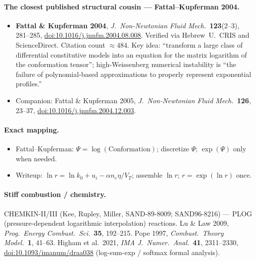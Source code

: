 \documentclass[11pt]{article}
\newcommand{\VT}{V_{T}}
\begin{document}
\paragraph{The closest published structural cousin --- Fattal--Kupferman 2004.}
\begin{itemize}
\item \textbf{Fattal \& Kupferman 2004}, \emph{J.~Non-Newtonian Fluid Mech.}\
      \textbf{123}(2--3), 281--285,
      \href{https://doi.org/10.1016/j.jnnfm.2004.08.008}{doi:10.1016/j.jnnfm.2004.08.008}.
      Verified via Hebrew~U.\ CRIS and ScienceDirect. Citation count
      $\approx 484$. Key idea: ``transform a large class of differential
      constitutive models into an equation for the matrix logarithm of the
      conformation tensor''; high-Weissenberg numerical instability is
      ``the failure of polynomial-based approximations to properly represent
      exponential profiles.''
\item Companion: Fattal \& Kupferman 2005, \emph{J.~Non-Newtonian Fluid
      Mech.}\ \textbf{126}, 23--37,
      \href{https://doi.org/10.1016/j.jnnfm.2004.12.003}{doi:10.1016/j.jnnfm.2004.12.003}.
\end{itemize}

\paragraph{Exact mapping.}
\begin{itemize}
\item Fattal--Kupferman: $\Psi=\log(\mathrm{Conformation})$; discretize
      $\Psi$; $\exp(\Psi)$ only when needed.
\item Writeup: $\ln r=\ln k_0+u_i-\alpha n_e\eta/\VT$; assemble $\ln r$;
      $r=\exp(\ln r)$ once.
\end{itemize}

\paragraph{Stiff combustion / chemistry.}
CHEMKIN-II/III (Kee, Rupley, Miller, SAND-89-8009; SAND96-8216) --- PLOG
(pressure-dependent logarithmic interpolation) reactions. Lu \& Law 2009,
\emph{Prog.~Energy Combust.~Sci.}\ \textbf{35}, 192--215. Pope 1997,
\emph{Combust.~Theory Model.}\ \textbf{1}, 41--63. Higham et al.\ 2021,
\emph{IMA J.~Numer.~Anal.}\ \textbf{41}, 2311--2330,
\href{https://doi.org/10.1093/imanum/draa038}{doi:10.1093/imanum/draa038}
(log-sum-exp / softmax formal analysis).
\end{document}
